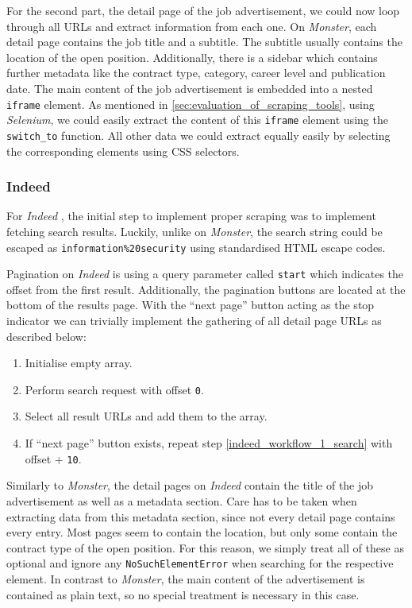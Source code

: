 \documentclass[runningheads]{llncs}
\begin{document}
For the second part, the detail page of the job advertisement, we could now loop through all URLs and extract information from each one. On \textit{Monster}, each detail page contains the job title and a subtitle. The subtitle usually contains the location of the open position. Additionally, there is a sidebar which contains further metadata like the contract type, category, career level and publication date. The main content of the job advertisement is embedded into a nested \texttt{iframe} element. As mentioned in \autoref{sec:evaluation_of_scraping_tools}, using \textit{Selenium}, we could easily extract the content of this \texttt{iframe} element using the \texttt{switch\_to} function. All other data we could extract equally easily by selecting the corresponding elements using CSS selectors.

\subsubsection{Indeed}
\label{subsub:indeed}

For \textit{Indeed} \cite{indeed}, the initial step to implement proper scraping was to implement fetching search results. Luckily, unlike on \textit{Monster}, the search string could be escaped as \texttt{information\%20security} using standardised HTML escape codes.

Pagination on \textit{Indeed} is using a query parameter called \texttt{start} which indicates the offset from the first result. Additionally, the pagination buttons are located at the bottom of the results page. With the “next page” button acting as the stop indicator we can trivially implement the gathering of all detail page URLs as described below:

\begin{enumerate}
  \item Initialise empty array.
  \item \label{indeed_workflow_1_search}
    Perform search request with offset \texttt{0}.
  \item Select all result URLs and add them to the array.
  \item If “next page” button exists, repeat step \ref{indeed_workflow_1_search} with offset + \texttt{10}.
\end{enumerate}

Similarly to \textit{Monster}, the detail pages on \textit{Indeed} contain the title of the job advertisement as well as a metadata section. Care has to be taken when extracting data from this metadata section, since not every detail page contains every entry. Most pages seem to contain the location, but only some contain the contract type of the open position. For this reason, we simply treat all of these as optional and ignore any \texttt{NoSuchElementError} when searching for the respective element. In contrast to \textit{Monster}, the main content of the advertisement is contained as plain text, so no special treatment is necessary in this case.
\end{document}
